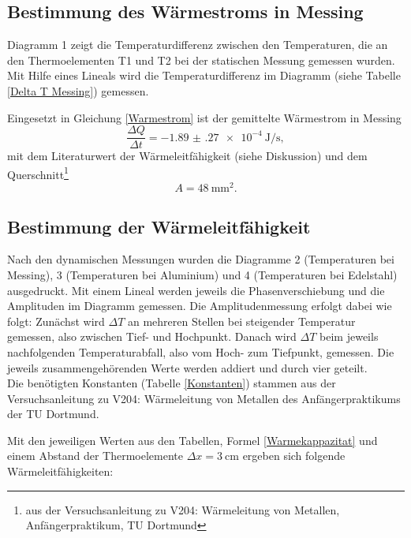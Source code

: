 \subsection{Bestimmung des Wärmestroms in Messing}
Diagramm 1 zeigt die Temperaturdifferenz zwischen den Temperaturen, die an den Thermoelementen T1 und T2 bei der statischen Messung gemessen wurden. Mit Hilfe eines Lineals wird die Temperaturdifferenz im Diagramm (siehe Tabelle \ref{Delta T Messing}) gemessen.

Eingesetzt in Gleichung \eqref{Warmestrom} ist der gemittelte Wärmestrom in Messing
\begin{equation}
	\frac{\Delta Q}{\Delta t} = \SI{-1.89(27)e-4}{\joule\per\second},
\end{equation}
mit dem Literaturwert der Wärmeleitfähigkeit (siehe Diskussion) und dem Querschnitt\footnote{aus der Versuchsanleitung zu V204: Wärmeleitung von Metallen, Anfängerpraktikum, TU Dortmund}
\begin{equation}
	A = \SI{48}{\milli\metre\squared}.
\end{equation}
\clearpage

\subsection{Bestimmung der Wärmeleitfähigkeit}
Nach den dynamischen Messungen wurden die Diagramme 2 (Temperaturen bei Messing), 3 (Temperaturen bei Aluminium) und 4 (Temperaturen bei Edelstahl) ausgedruckt. Mit einem Lineal werden jeweils die Phasenverschiebung und die Amplituden im Diagramm gemessen. Die Amplitudenmessung erfolgt dabei wie folgt: Zunächst wird $\Delta T$ an mehreren Stellen bei steigender Temperatur gemessen, also zwischen Tief- und Hochpunkt. Danach wird $\Delta T$ beim jeweils nachfolgenden Temperaturabfall, also vom Hoch- zum Tiefpunkt, gemessen. Die jeweils zusammengehörenden Werte werden addiert und durch vier geteilt. \\
Die benötigten Konstanten (Tabelle \ref{Konstanten}) stammen aus der Versuchsanleitung zu V204: Wärmeleitung von Metallen des Anfängerpraktikums der TU Dortmund.







Mit den jeweiligen Werten aus den Tabellen, Formel \eqref{Warmekappazitat} und einem Abstand der Thermoelemente $\Delta x = \SI{3}{\centi\metre}$ ergeben sich folgende Wärmeleitfähigkeiten:


